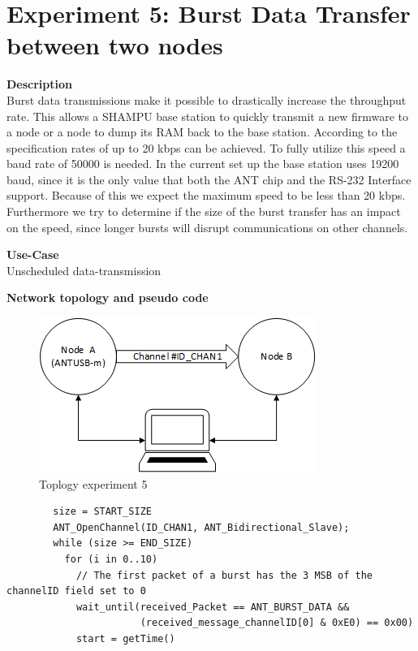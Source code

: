 \section{Experiment 5: Burst Data Transfer between two nodes}
\begin{description} 
	\item{\textbf{Description}} \hfill \\ Burst data transmissions make it possible to drastically increase the throughput rate. This allows a SHAMPU base station to quickly transmit a new firmware to a node or a node to dump its RAM back to the base station.	According to the  specification rates of up to 20 kbps can be achieved. To fully utilize this speed a baud rate of 50000 is needed. In the current set up the base station uses 19200 baud, since it is the only value that both the ANT chip and the RS-232 Interface support. Because of this we expect the maximum speed to be less than 20 kbps. Furthermore we try to determine if the size of the burst transfer has an impact on the speed, since longer bursts will disrupt communications on other channels.
	\item{\textbf{Use-Case}} \hfill \\ Unscheduled data-transmission
	\item{\textbf{Network topology and pseudo code}} \hfill \\ 
	\begin{figure}[H]
		\centering
		\includegraphics[scale=1]{content/images/exp5_topo.png}
		\caption{Toplogy experiment 5}
	\end{figure}
	\begin{code}[H]
		\begin{verbatim}
		size = START_SIZE
		ANT_OpenChannel(ID_CHAN1, ANT_Bidirectional_Slave);		
		while (size >= END_SIZE)
		  for (i in 0..10) 
		    // The first packet of a burst has the 3 MSB of the channelID field set to 0
		    wait_until(received_Packet == ANT_BURST_DATA && 
		               (received_message_channelID[0] & 0xE0) == 0x00)
		    start = getTime()

\end{verbatim}
\end{code}
\end{description}
